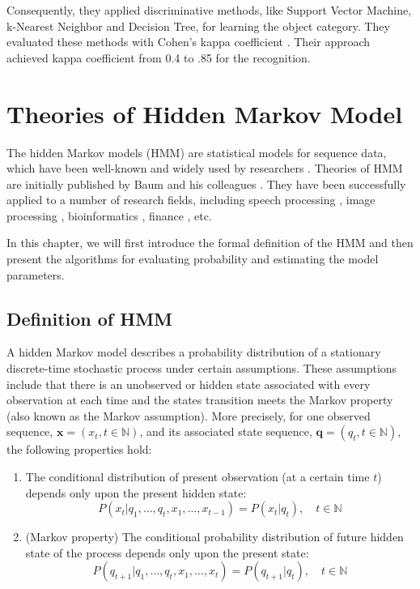 \documentclass[12pt,final,twoside]{report}
\theoremstyle{plain}
\theoremstyle{definition}
\theoremstyle{remark}
\begin{document}
Consequently, they applied discriminative methods, like Support Vector Machine, k-Nearest Neighbor and Decision Tree, for learning the object category. They evaluated these methods with Cohen's kappa coefficient \cite{cohen_coefficient_1960}. Their approach achieved kappa coefficient from 0.4 to .85 for the recognition.

\cleardoublepage
\chapter{Theories of Hidden Markov Model}
The hidden Markov models (HMM) are statistical models for sequence data, which have been well-known and widely used by researchers \cite{rabiner_fundamentals_1993}. Theories of HMM are initially published by Baum and his colleagues \cite{baum_statistical_1966, baum_maximization_1970}. They have been successfully applied to a number of research fields, including speech processing \cite{baker_dragon_1975, rabiner_fundamentals_1993}, image processing \cite{chen_off-line_1994}, bioinformatics \cite{koski_hidden_2001}, finance \cite{bhar_hidden_2004}, etc.

In this chapter, we will first introduce the formal definition of the HMM and then present the algorithms for evaluating probability and estimating the model parameters.

\section{Definition of HMM}
A hidden Markov model describes a probability distribution of a stationary discrete-time stochastic process under certain assumptions. These assumptions include that there is an unobserved or hidden state associated with every observation at each time and the states transition meets the Markov property (also known as the Markov assumption). More precisely, for one observed sequence, $\mathbf{x}=(x_t, t \in \mathbb{N})$, and its associated state sequence, $\mathbf{q}=(q_t, t \in \mathbb{N})$, the following properties hold:

\begin{enumerate}
  \item The conditional distribution of present observation (at a certain time $t$) depends only upon the present hidden state:
  \begin{equation} \label{eq:ob_prob}
    P(x_t|q_1, \dots, q_t, x_1, \dots, x_{t-1}) = P(x_t|q_t),\quad t \in \mathbb{N} 
  \end{equation}
  \item (Markov property) The conditional probability distribution of future hidden state of the process depends only upon the present state:
  \begin{equation} \label{eq:markov_prop}
    P(q_{t+1}|q_1, \dots, q_t, x_1, \dots, x_t) = P(q_{t+1}|q_t),\quad t \in \mathbb{N}
  \end{equation}
\end{enumerate}
\end{document}
